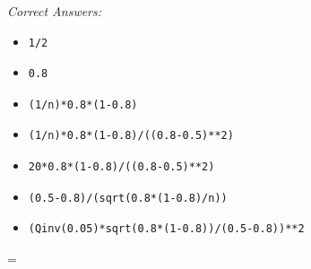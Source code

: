 \documentclass[10pt,dvips]{amsart}
\begin{document}
\par{\small{\it Correct Answers:}
\vspace{-\parskip}\begin{itemize}
\item\begin{verbatim}1/2\end{verbatim}
\item\begin{verbatim}0.8\end{verbatim}
\item\begin{verbatim}(1/n)*0.8*(1-0.8)\end{verbatim}
\item\begin{verbatim}(1/n)*0.8*(1-0.8)/((0.8-0.5)**2)\end{verbatim}
\item\begin{verbatim}20*0.8*(1-0.8)/((0.8-0.5)**2)\end{verbatim}
\item\begin{verbatim}(0.5-0.8)/(sqrt(0.8*(1-0.8)/n))\end{verbatim}
\item\begin{verbatim}(Qinv(0.05)*sqrt(0.8*(1-0.8))/(0.5-0.8))**2\end{verbatim}
\end{itemize}}\par



\columnwidth=\linewidth


% 
% 
\vfill
\end{document}
